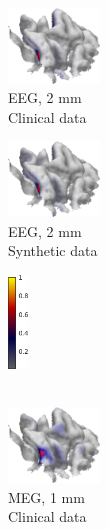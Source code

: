 \documentclass[5p]{elsarticle}
\begin{document}
\begin{figure}[h!]
\begin{footnotesize}
\begin{center}
\begin{minipage}{0.5cm}
\begin{center}
\end{center}
\end{minipage} \vskip0.2cm
\begin{minipage}{3cm} \begin{center}
\includegraphics[height=2.0cm]{MAP_EEG_G_2mm.png}\\ EEG, 2 mm \\ Clinical data
\end{center}\end{minipage}
\begin{minipage}{3cm} \begin{center}
\includegraphics[height=2.0cm]{MAP_EEG_G_2mm_syntheticdata.png} \\ EEG, 2 mm \\ Synthetic data
\end{center}\end{minipage}
\begin{minipage}{0.5cm} \begin{center}
\includegraphics[height=2.5cm]{colorbar.png} \\ \mbox{} \\ \mbox{}
\end{center}
\end{minipage} \vskip0.2cm
\begin{minipage}{3cm} \begin{center}
\includegraphics[height=2.0cm]{MAP_MEG_G_1mm.png} \\ MEG, 1 mm \\ Clinical data

\end{center}
\end{minipage}
\end{center}
\end{footnotesize}
\end{figure}
\end{document}
